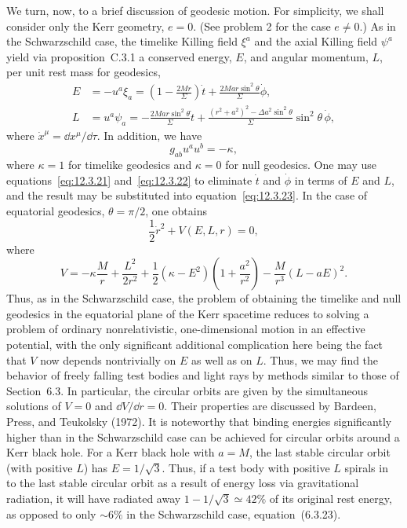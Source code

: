 We turn, now, to a brief discussion of geodesic motion. For simplicity, we shall
consider only the Kerr geometry, \(e=0\). (See problem 2 for the case \(e\ne0\).) As
in the Schwarzschild case, the timelike Killing field \(\xi^a\) and the axial Killing
field \(\psi^a\) yield via proposition~C.3.1 a conserved energy, \(E\), and angular
momentum, \(L\), per unit rest mass for geodesics,
\begin{align}
 E&=-u^a\xi_a=\left(1-\frac{2Mr}{\Sigma}\right)\dot t+
       \frac{2Mar\sin^2\theta}{\Sigma}\dot\phi,
       \tag{12.3.21}\label{eq:12.3.21}\\
 L&=u^a\psi_a=-\frac{2Mar\sin^2\theta}{\Sigma}\dot t+
       \frac{(r^2+a^2)^2-\Delta a^2\sin^2\theta}{\Sigma}
       \sin^2\theta\,\dot\phi,
       \tag{12.3.22}\label{eq:12.3.22}
\end{align}
where \(\dot x^\mu=\dd x^\mu/\dd\tau\). In addition, we have
\begin{equation}
 g_{ab}u^au^b=-\kappa,
 \tag{12.3.23}\label{eq:12.3.23}
\end{equation}
where \(\kappa=1\) for timelike geodesics and \(\kappa=0\) for null geodesics. One
may use equations~\eqref{eq:12.3.21} and~\eqref{eq:12.3.22} to eliminate \(\dot t\)
and \(\dot\phi\) in terms of \(E\) and \(L\), and the result may be substituted into
equation~\eqref{eq:12.3.23}. In the case of equatorial geodesics,
\(\theta=\pi/2\), one obtains
\begin{equation}
 \frac12\dot r^2+V(E,L,r)=0,
 \tag{12.3.24}\label{eq:12.3.24}
\end{equation}
where
\begin{equation}
 V=-\kappa\frac Mr+\frac{L^2}{2r^2}
  +\frac12(\kappa-E^2)\left(1+\frac{a^2}{r^2}\right)
  -\frac M{r^3}(L-aE)^2 .
 \tag{12.3.25}\label{eq:12.3.25}
\end{equation}
Thus, as in the Schwarzschild case, the problem of obtaining the timelike and null
geodesics in the equatorial plane of the Kerr spacetime reduces to solving a problem
of ordinary nonrelativistic, one-dimensional motion in an effective potential, with
the only significant additional complication here being the fact that \(V\) now
depends nontrivially on \(E\) as well as on \(L\). Thus, we may find the behavior of
freely falling test bodies and light rays by methods similar to those of Section~6.3.
In particular, the circular orbits are given by the simultaneous solutions of \(V=0\)
and \(\dd V/\dd r=0\). Their properties are discussed by Bardeen, Press, and
Teukolsky (1972). It is noteworthy that binding energies significantly higher than in
the Schwarzschild case can be achieved for circular orbits around a Kerr black hole.
For a Kerr black hole with \(a=M\), the last stable circular orbit (with positive \(L\))
has \(E=1/\sqrt3\). Thus, if a test body with positive \(L\) spirals in to the last
stable circular orbit as a result of energy loss via gravitational radiation, it will have
radiated away \(1-1/\sqrt3\simeq42\%\) of its original rest energy, as opposed to
only \(\sim6\%\) in the Schwarzschild case, equation~(6.3.23).

